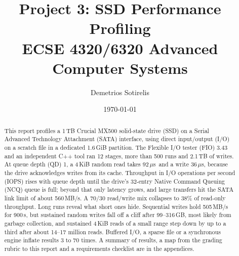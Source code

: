 \documentclass{article}
\title{Project 3: SSD Performance Profiling\\[3pt]\large ECSE 4320/6320 Advanced Computer Systems}
\author{Demetrios Sotirelis}
\date{\today}
\newcommand{\us}{\,$\mu$s}
\begin{document}
\maketitle

\begin{abstract}
This report profiles a 1\,TB Crucial MX500 solid-state drive (SSD) on a Serial Advanced Technology Attachment (SATA) interface, using direct input/output (I/O) on a scratch file in a dedicated 1.6\,GiB partition. The Flexible I/O tester (FIO) 3.43 and an independent C++ tool ran 12 stages, more than 500 runs and 2.1\,TB of writes. At queue depth (QD) 1, a 4\,KiB random read takes 92\us\ and a write 36\us, because the drive acknowledges writes from its cache. Throughput in I/O operations per second (IOPS) rises with queue depth until the drive's 32-entry Native Command Queuing (NCQ) queue is full; beyond that only latency grows, and large transfers hit the SATA link limit of about 560\,MB/s. A 70/30 read/write mix collapses to 38\% of read-only throughput. Long runs reveal what short ones hide. Sequential writes hold 505\,MB/s for 900\,s, but sustained random writes fall off a cliff after 99--316\,GB, most likely from garbage collection, and sustained 4\,KiB reads of a small range step down by up to a third after about 14--17 million reads. Buffered I/O, a sparse file or a synchronous engine inflate results 3 to 70 times. A summary of results, a map from the grading rubric to this report and a requirements checklist are in the appendices.
\end{abstract}
\end{document}
